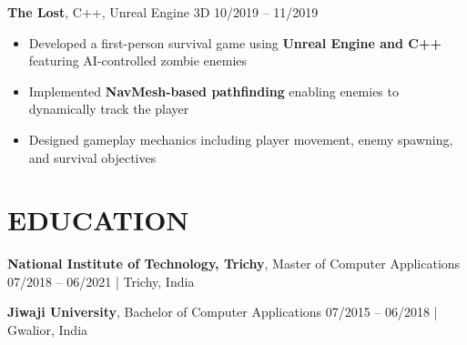 \documentclass[11.9pt,a4paper]{article}
\begin{document}
\vspace{5pt}

\noindent
\textbf{The Lost}, C++, Unreal Engine 3D \hfill 10/2019 -- 11/2019
\begin{itemize}
  \item Developed a first-person survival game using \textbf{Unreal Engine and C++} featuring AI-controlled zombie enemies
  \item Implemented \textbf{NavMesh-based pathfinding} enabling enemies to dynamically track the player
  \item Designed gameplay mechanics including player movement, enemy spawning, and survival objectives
\end{itemize}

\section*{EDUCATION}

\noindent
\textbf{National Institute of Technology, Trichy}, Master of Computer Applications \hfill 07/2018 -- 06/2021 | Trichy, India

\vspace{5pt}

\noindent
\textbf{Jiwaji University}, Bachelor of Computer Applications \hfill 07/2015 -- 06/2018 | Gwalior, India

\vspace{6pt}
\end{document}
